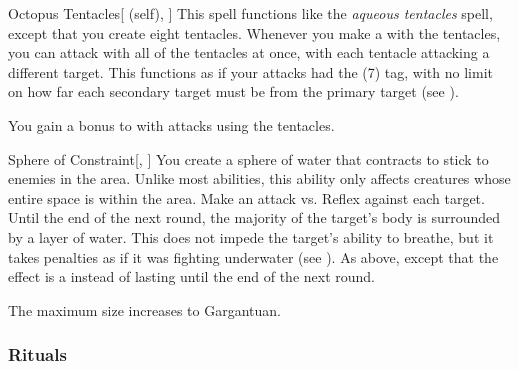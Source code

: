 \lowercase{\hypertarget{spell:Octopus Tentacles}{}}\label{spell:Octopus Tentacles}
\begin{attuneability}[Rank 5]{\hypertarget{spell:Octopus Tentacles}{Octopus Tentacles}}[ (self), ]
This spell functions like the \textit{aqueous tentacles} spell, except that you create eight tentacles.
Whenever you make a  with the tentacles, you can attack with all of the tentacles at once, with each tentacle attacking a different target.
This functions as if your attacks had the  (7) tag, with no limit on how far each secondary target must be from the primary target (see ).

\rankline
{} You gain a  bonus to  with attacks using the tentacles.

\end{attuneability}
\vspace{0.25em}



\lowercase{\hypertarget{spell:Sphere of Constraint}{}}\label{spell:Sphere of Constraint}
\begin{freeability}[Rank 5]{\hypertarget{spell:Sphere of Constraint}{Sphere of Constraint}}[, ]
You create a sphere of water that contracts to stick to enemies in the area.
Unlike most abilities, this ability only affects creatures whose entire space is within the area.
Make an attack vs. Reflex against each target.
\hit Until the end of the next round, the majority of the target's body is surrounded by a layer of water.
This does not impede the target's ability to breathe, but it takes penalties as if it was fighting underwater (see ).
\crit As above, except that the effect is a  instead of lasting until the end of the next round.

\rankline
{} The maximum size increases to Gargantuan.

\end{freeability}
\vspace{0.25em}



\subsubsection{Rituals}


